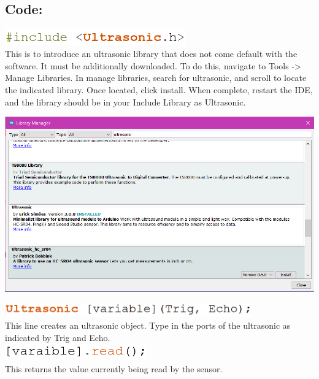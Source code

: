 \documentclass[a4paper,12pt]{report}
\newcommand{\diagramWidth}{150mm}
\newcommand{\codeHeight}{7mm}
\begin{document}
    \subsection*{Code:}
        \begin{mdframed}[linewidth = 3, linecolor = turbo_purple]
            \includegraphics[height = \codeHeight]{Assets/include_u.png} \\
            This is to introduce an ultrasonic library that does not come default with the software. It must be additionally downloaded. To do this, navigate to Tools -> Manage Libraries. In manage libraries, search for ultrasonic, and scroll to locate the indicated library. Once located, click install. When complete, restart the IDE, and the library should be in your Include Library as Ultrasonic. \\
            \begin{center}
                \includegraphics[width = \diagramWidth]{Assets/ultrasonic_library.png}
            \end{center}
            \includegraphics[height = 6mm]{Assets/ultrasonic_init.png} \\
            This line creates an ultrasonic object. Type in the ports of the ultrasonic as indicated by Trig and Echo. \\
            \includegraphics[height = \codeHeight]{Assets/ultrasonic_read.png} \\
            This returns the value currently being read by the sensor.
        \end{mdframed}
\end{document}

